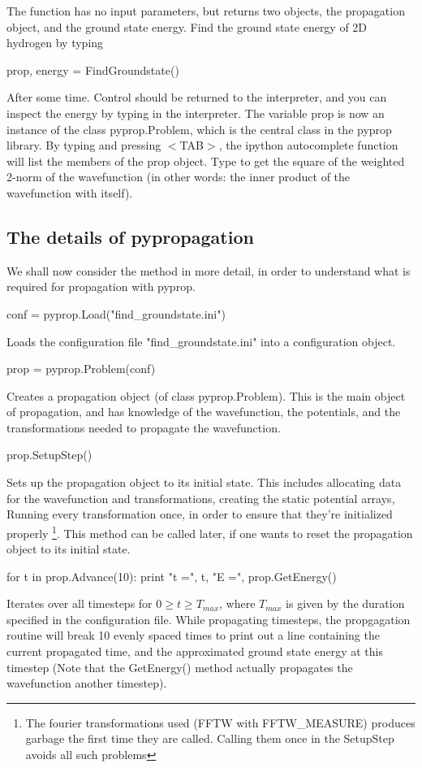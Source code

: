 The function  has no input parameters, but returns two objects, the propagation object, and the 
ground state energy. Find the ground state energy of 2D hydrogen by typing
\begin{python}
	prop, energy = FindGroundstate()
\end{python}
After some time. Control should be returned to the interpreter, and you can inspect the energy by typing  in
the interpreter. The variable prop is now an instance of the class pyprop.Problem, which is the central class in the
pyprop library. By typing  and pressing $<$TAB$>$, the ipython autocomplete function will list the members of
the prop object. Type  to get the square of the weighted 2-norm of the wavefunction (in other 
words: the inner product of the wavefunction with itself).

\subsection{The details of pypropagation}
We shall now consider the method  in more detail, in order to understand what is required for 
propagation with pyprop.
\begin{python}
	conf = pyprop.Load("find_groundstate.ini")
\end{python}
Loads the configuration file "find\_groundstate.ini" into a configuration object. 
\begin{python}
	prop = pyprop.Problem(conf)
\end{python}
Creates a propagation object (of class pyprop.Problem). This is the main object of propagation, and has knowledge of 
the wavefunction, the potentials, and the transformations needed to propagate the wavefunction. 
\begin{python}
	prop.SetupStep()
\end{python}
Sets up the propagation object to its initial state. This includes allocating data for the wavefunction and transformations,
creating the static potential arrays, Running every transformation once, in order to ensure that they're initialized properly
\footnote{The fourier transformations used (FFTW with FFTW\_MEASURE) produces garbage the first time they are called. Calling
them once in the SetupStep avoids all such problems}. This method can be called later, if one wants to reset the propagation
object to its initial state.
\begin{python}
	for t in prop.Advance(10):
	    print "t =", t, "E =", prop.GetEnergy()
\end{python}
Iterates over all timesteps for $0 \ge t \ge T_{max}$, where $T_{max}$ is given by the duration specified in the 
configuration file. While propagating timesteps, the propgagation routine will break 10 evenly spaced times to print
out a line containing the current propagated time, and the approximated ground state energy at this timestep (Note 
that the GetEnergy() method actually propagates the wavefunction another timestep).

